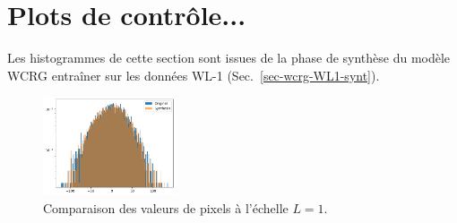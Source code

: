 \documentclass[12pt,twoside]{article}
\begin{document}
{}



\appendix
\section{Plots de contrôle...}
Les histogrammes de cette section sont issues de la phase de synthèse du modèle WCRG entraîner sur les données WL-1 (Sec.~\ref{sec-wcrg-WL1-synt}).
\begin{figure}[h]
\centering
\includegraphics[width=0.35\textwidth]{fig-WL1-synt-L1-pixelval.png}
\caption{Comparaison des valeurs de pixels à l'échelle $L=1$.}
\label{fig-WL1-synt-L1-pixelval}
\end{figure}
\end{document}

